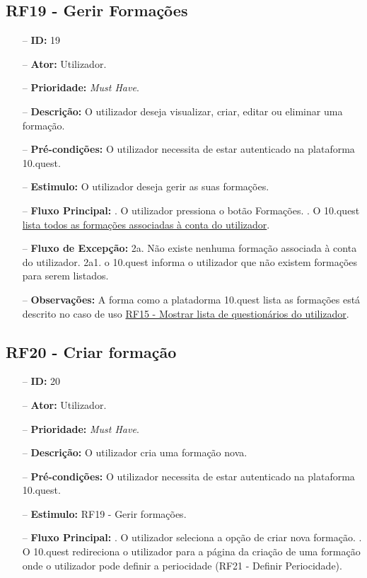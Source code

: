 \subsection{RF19 - Gerir Formações}
\begin{itemize}
	\item[--] \textbf{ID:} 19
	\item[--]  \textbf{Ator:} Utilizador.
	\item[--]  \textbf{Prioridade:} \textit{Must Have}.
	\item[--]  \textbf{Descrição:} O utilizador deseja visualizar, criar, editar ou eliminar uma formação.
	\item[--]  \textbf{Pré-condições:} O utilizador necessita de estar autenticado na plataforma 10.quest.
	\item[--]  \textbf{Estimulo:} O utilizador deseja gerir as suas formações.
	\item[--]  \textbf{Fluxo Principal:} 
	. O utilizador pressiona o botão Formações.
	. O 10.quest  \underline{lista todos as formações associadas à conta do utilizador}.
	\item[--]  \textbf{Fluxo de Excepção:} 
	\subitem 2a. Não existe nenhuma formação associada à conta do utilizador.
	\subitem 2a1. o 10.quest informa o utilizador que não existem formações para serem listados.
	\item[--]  \textbf{Observações:} A forma como a platadorma 10.quest lista as formações está descrito no caso de uso \underline{RF15 - Mostrar lista de questionários do utilizador}.
\end{itemize}
\newpage

\subsection{RF20 - Criar formação}
\begin{itemize}
	\item[--] \textbf{ID:} 20
	\item[--]  \textbf{Ator:} Utilizador.
	\item[--]  \textbf{Prioridade:} \textit{Must Have}.
	\item[--]  \textbf{Descrição:} O utilizador cria uma formação nova.
	\item[--]  \textbf{Pré-condições:} O utilizador necessita de estar autenticado na plataforma 10.quest.
	\item[--]  \textbf{Estimulo:} RF19 - Gerir formações.
	\item[--]  \textbf{Fluxo Principal:} 
		. O utilizador seleciona a opção de criar nova formação.
		. O 10.quest redireciona o utilizador para a página da criação de uma formação onde o utilizador pode definir a periocidade (RF21 - Definir Periocidade).
\end{itemize}
\newpage

